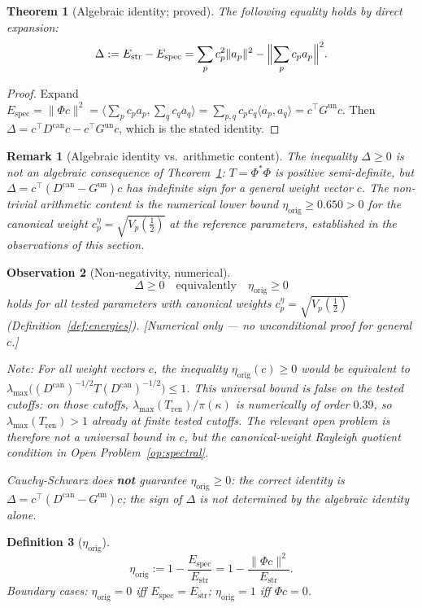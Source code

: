 \documentclass[11pt]{article}
\newtheorem{theorem}{Theorem}[section]
\newtheorem{definition}[theorem]{Definition}
\newtheorem{observation}[theorem]{Observation}
\newtheorem*{remark}{Remark}
\newcommand{\Estr}{E_{\mathrm{str}}}
\newcommand{\Espec}{E_{\mathrm{spec}}}
\newcommand{\etaorig}{\eta_{\mathrm{orig}}}
\newcommand{\Tren}{T_{\mathrm{ren}}}
\newcommand{\Gun}{G^{\mathrm{un}}}
\newcommand{\Dcan}{D^{\mathrm{can}}}
\newcommand{\ceta}{c_p^{\eta}}
\begin{document}
\begin{theorem}[Algebraic identity; proved]
\label{thm:identity}
The following equality holds by direct expansion:
\[
\Delta:=\Estr-\Espec=\sum_p c_p^2\|a_p\|^2-\Bigl\|\sum_p c_p a_p\Bigr\|^2.
\]
\end{theorem}

\begin{proof}
Expand $\Espec=\|\Phi c\|^2=\bigl\langle\sum_p c_p a_p,\sum_q c_q
a_q\bigr\rangle=\sum_{p,q}c_p c_q\langle a_p,a_q\rangle=c^\top\Gun c$.
Then $\Delta=c^\top\Dcan c-c^\top\Gun c$, which is the stated identity.
\end{proof}

\begin{remark}[Algebraic identity vs.\ arithmetic content]
The inequality $\Delta\geq0$ is \emph{not} an algebraic consequence of
Theorem~\ref{thm:identity}: $T=\Phi^*\Phi$ is positive semi-definite,
but $\Delta=c^\top(\Dcan-\Gun)c$ has indefinite sign for a general
weight vector $c$. The non-trivial arithmetic content is the numerical
lower bound $\etaorig\geq0.650>0$ for the canonical weight
$\ceta=\sqrt{V_p(\tfrac12)}$ at the reference parameters, established
in the observations of this section.
\end{remark}

\begin{observation}[Non-negativity, numerical]
\label{obs:nonneg}
\[
\Delta\geq 0\quad\text{equivalently}\quad\etaorig\geq 0
\]
holds for all tested parameters with canonical weights
$\ceta=\sqrt{V_p(\tfrac12)}$ (Definition~\ref{def:energies}).
\emph{[Numerical only --- no unconditional proof for general $c$.]}

Note: For \emph{all} weight vectors $c$, the inequality $\etaorig(c)\geq 0$
would be equivalent to
$\lambda_{\max}\bigl((\Dcan)^{-1/2}T(\Dcan)^{-1/2}\bigr)\leq 1$.
This universal bound is false on the tested cutoffs: on those cutoffs,
$\lambda_{\max}(\Tren)/\pi(\kappa)$ is numerically of order $0.39$, so
$\lambda_{\max}(\Tren)>1$ already at finite tested cutoffs.
The relevant open problem is therefore not a universal bound in $c$,
but the canonical-weight Rayleigh quotient condition in
Open Problem~\ref{op:spectral}.

\emph{Cauchy-Schwarz does \textbf{not} guarantee $\etaorig\geq 0$}: the
correct identity is $\Delta=c^\top(\Dcan-\Gun)c$; the sign of $\Delta$ is not
determined by the algebraic identity alone.
\end{observation}

\begin{definition}[$\etaorig$]
\label{def:eta}
\[
\etaorig:=1-\frac{\Espec}{\Estr}=1-\frac{\|\Phi c\|^2}{\Estr}.
\]
Boundary cases: $\etaorig=0$ iff $\Espec=\Estr$; $\etaorig=1$ iff $\Phi c=0$.
\end{definition}
\end{document}
